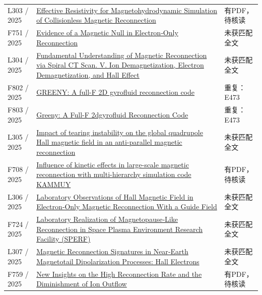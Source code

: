 \begin{longtable}{P{24mm}P{97mm}P{27mm}}
L303 / 2025 & \href{https://doi.org/10.1029/2025ja034289}{Effective Resistivity for Magnetohydrodynamic Simulation of Collisionless Magnetic Reconnection} & 有PDF，待核读\\

F751 / 2025 & \href{https://doi.org/10.1029/2024gl113104}{Evidence of a Magnetic Null in Electron‐Only Reconnection} & 未获匹配全文\\

L304 / 2025 & \href{https://doi.org/10.3847/1538-4357/ae0ffc}{Fundamental Understanding of Magnetic Reconnection via Spiral CT Scan. V. Ion Demagnetization,  Electron Demagnetization,  and Hall Effect} & 未获匹配全文\\

F802 / 2025 & \href{https://doi.org/10.1016/j.cpc.2025.109807}{GREENY: A full-F 2D gyrofluid reconnection code} & 重复：E473\\

F803 / 2025 & \href{https://doi.org/10.2139/ssrn.5201132}{Greeny: A Full-F 2dgyrofluid Reconnection Code} & 重复：E473\\

L305 / 2025 & \href{https://doi.org/10.1063/5.0259029}{Impact of tearing instability on the global quadrupole Hall magnetic field in an anti-parallel magnetic reconnection} & 未获匹配全文\\

F708 / 2025 & \href{https://doi.org/10.1093/pasj/psaf123}{Influence of kinetic effects in large-scale magnetic reconnection with multi-hierarchy simulation code KAMMUY} & 有PDF，待核读\\

L306 / 2025 & \href{https://doi.org/10.1029/2024gl114151}{Laboratory Observations of Hall Magnetic Field in Electron‐Only Magnetic Reconnection With a Guide Field} & 未获匹配全文\\

F724 / 2025 & \href{https://doi.org/10.1029/2025gl117351}{Laboratory Realization of Magnetopause‐Like Reconnection in Space Plasma Environment Research Facility (SPERF)} & 未获匹配全文\\

L307 / 2025 & \href{https://doi.org/10.1029/2025ja033875}{Magnetic Reconnection Signatures in Near‐Earth Magnetotail Dipolarization Processes: Hall Electrons} & 未获匹配全文\\

F759 / 2025 & \href{https://doi.org/10.1029/2024gl113889}{New Insights on the High Reconnection Rate and the Diminishment of Ion Outflow} & 有PDF，待核读\\


\end{longtable}

